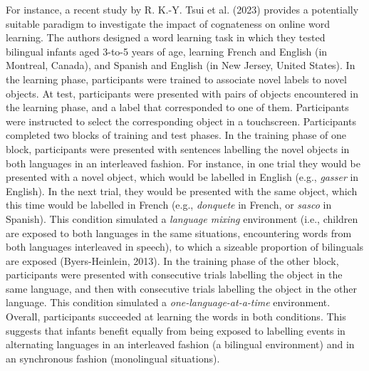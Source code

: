 \documentclass[
  12pt,
  b5paperpaper,
  twoside]{scrreprt}
\begin{document}
For instance, a recent study by R. K.-Y. Tsui et al. (2023) provides a
potentially suitable paradigm to investigate the impact of cognateness
on online word learning. The authors designed a word learning task in
which they tested bilingual infants aged 3-to-5 years of age, learning
French and English (in Montreal, Canada), and Spanish and English (in
New Jersey, United States). In the learning phase, participants were
trained to associate novel labels to novel objects. At test,
participants were presented with pairs of objects encountered in the
learning phase, and a label that corresponded to one of them.
Participants were instructed to select the corresponding object in a
touchscreen. Participants completed two blocks of training and test
phases. In the training phase of one block, participants were presented
with sentences labelling the novel objects in both languages in an
interleaved fashion. For instance, in one trial they would be presented
with a novel object, which would be labelled in English (e.g.,
\emph{gasser} in English). In the next trial, they would be presented
with the same object, which this time would be labelled in French (e.g.,
\emph{donquete} in French, or \emph{sasco} in Spanish). This condition
simulated a \emph{language mixing} environment (i.e., children are
exposed to both languages in the same situations, encountering words
from both languages interleaved in speech), to which a sizeable
proportion of bilinguals are exposed (Byers-Heinlein, 2013). In the
training phase of the other block, participants were presented with
consecutive trials labelling the object in the same language, and then
with consecutive trials labelling the object in the other language. This
condition simulated a \emph{one-language-at-a-time} environment.
Overall, participants succeeded at learning the words in both
conditions. This suggests that infants benefit equally from being
exposed to labelling events in alternating languages in an interleaved
fashion (a bilingual environment) and in an synchronous fashion
(monolingual situations).
\end{document}
